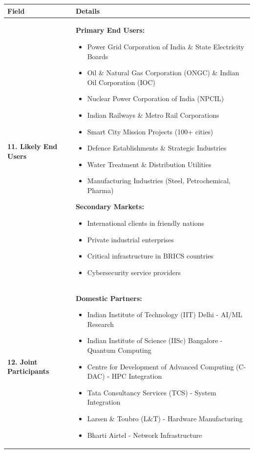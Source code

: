 \documentclass[12pt,a4paper]{article}
\begin{document}
\begin{longtable}{|p{3cm}|p{12cm}|}
\hline
\rowcolor{lightblue}
\textbf{Field} & \textbf{Details} \\
\hline
\endhead

\textbf{11. Likely End Users} & 
\textbf{Primary End Users:}
\begin{itemize}[leftmargin=1em]
    \item Power Grid Corporation of India \& State Electricity Boards
    \item Oil \& Natural Gas Corporation (ONGC) \& Indian Oil Corporation (IOC)
    \item Nuclear Power Corporation of India (NPCIL)
    \item Indian Railways \& Metro Rail Corporations
    \item Smart City Mission Projects (100+ cities)
    \item Defence Establishments \& Strategic Industries
    \item Water Treatment \& Distribution Utilities
    \item Manufacturing Industries (Steel, Petrochemical, Pharma)
\end{itemize}

\textbf{Secondary Markets:}
\begin{itemize}[leftmargin=1em]
    \item International clients in friendly nations
    \item Private industrial enterprises
    \item Critical infrastructure in BRICS countries
    \item Cybersecurity service providers
\end{itemize} \\
\hline

\textbf{12. Joint Participants} & 
\textbf{Domestic Partners:}
\begin{itemize}[leftmargin=1em]
    \item Indian Institute of Technology (IIT) Delhi - AI/ML Research
    \item Indian Institute of Science (IISc) Bangalore - Quantum Computing
    \item Centre for Development of Advanced Computing (C-DAC) - HPC Integration
    \item Tata Consultancy Services (TCS) - System Integration
    \item Larsen \& Toubro (L\&T) - Hardware Manufacturing
    \item Bharti Airtel - Network Infrastructure
\end{itemize}


\end{longtable}
\end{document}
